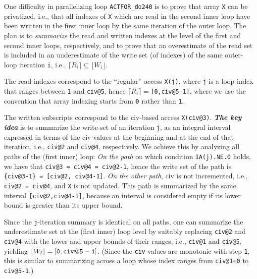 \documentclass{sig-alternate}
\begin{document}
One difficulty in parallelizing loop {\tt ACTFOR\_do240} is to
prove that array {\tt X} can be privatized, i.e., that all
indexes of {\tt X} which are read in the second inner loop have been 
written in the first inner loop by the same iteration of the outer loop.
The plan is to {\em summarize} the read and written indexes at the level of
the first and second inner loops, respectively, and to prove that an
overestimate of the read set  is included in an underestimate 
of the write set (of indexes) of the same outer-loop iteration {\tt i},
i.e., $\lceil R_i\rceil \subseteq \lfloor W_i\rfloor$.

The read indexes correspond to the ``regular'' access {\tt X(j)}, where
{\tt j} is a loop index that ranges between {\tt 1} and {\tt civ@5},
hence $\lceil R_i\rceil = ${\tt[0,civ@5-1]}, where we use the 
convention that array indexing starts from {\tt 0} rather than {\tt 1}.

The written subscripts correspond to the {\sc civ}-based access {\tt X(civ@3)}.
{\bf{\em{}The key idea}} is to summarize the write-set of an iteration {\tt j}, 
as an integral interval expressed in terms of the {\sc civ} values at the 
beginning and at the end of that iteration, i.e., {\tt civ@2} and {\tt civ@4}, 
respectively. 
We achieve this by analyzing all paths of the (first inner) loop: 
%
{\em On the path} on which condition {\tt IA(j).NE.0} holds, 
we have that {\tt civ@3~=~civ@4~=~civ@2-1},
hence the write set of the path is {\tt \{civ@3-1\}~=~[civ@2,~civ@4-1]}.
{\em On the other path}, {\sc civ} is not incremented, i.e., {\tt civ@2~=~civ@4},
and {\tt X} is not updated. 
%
This path is summarized by the same interval {\tt [civ@2,civ@4-1]},
because an interval is considered empty if its lower bound is greater 
than its upper bound. 

Since the {\tt j}-iteration summary is identical on all paths, one can 
summarize the underestimate set at the (first inner) loop level by suitably 
replacing {\tt civ@2} and {\tt civ@4} with the lower and upper bounds 
of their ranges, i.e., {\tt civ@1} and {\tt civ@5}, yielding 
$\lfloor W_i\rfloor={\tt [0,civ@5-1]}$.
(Since the {\tt civ} values are monotonic with step {\tt 1}, this is similar 
to summarizing across a loop whose index ranges from {\tt{}civ@1=0} to {\tt{}civ@5-1}.)
\end{document}
